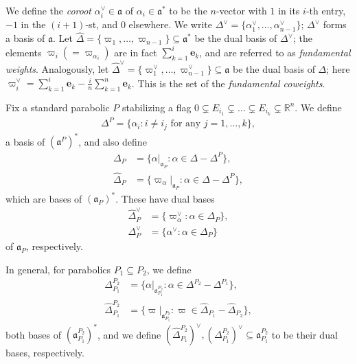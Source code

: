 \documentclass[11pt]{amsart}
\def\e{\textbf{e}}
\def\R{\mathbb{R}}
\numberwithin{theorem}{section}
\numberwithin{equation}{section}
\theoremstyle{remark}
\theoremstyle{definition}
\newcommand{\ga}{\mathfrak{a}}
\begin{document}
We define the \emph{coroot} $\alpha_i^\vee \in \ga$ of $\alpha_i \in \ga^*$ to be the $n$-vector with $1$ in its $i$-th entry, $-1$ in the $(i+1)$-st, and $0$ elsewhere. We write $\Delta^\vee = \{\alpha_1^\vee, \ldots, \alpha_{n-1}^\vee\}$; $\Delta^\vee$ forms a basis of $\ga$. Let $\widehat\Delta = \{\varpi_1,\ldots,\varpi_{n-1}\} \subseteq \ga^*$ be the dual basis of $\Delta^\vee$; the elements $\varpi_i (= \varpi_{\alpha_i})$ are in fact $\sum_{k=1}^i\e_k$, and are referred to as \emph{fundamental weights}. 
Analogously, let $\widehat\Delta^\vee = \{\varpi_1^\vee,\ldots,\varpi_{n-1}^\vee\} \subseteq \ga$ be the dual basis of $\Delta$; here $\varpi_i^\vee=\sum_{k=1}^i\e_k-\frac{i}{n}\sum_{k=1}^n\e_k$. This is the set of the \emph{fundamental coweights}.

Fix a standard parabolic $P$ stabilizing a flag $0 \subsetneq E_{i_1} \subsetneq \ldots \subsetneq E_{i_k} \subsetneq \R^n$. We define
\begin{align*}
\Delta^P = \{\alpha_i : i \neq i_j \mbox{ for any $j=1,\ldots,k$}\},
\end{align*}
a basis of $(\ga^P)^*$, and also define
\begin{align*}
\Delta_P &= \{\alpha \Big|_{\ga_{P}} : \alpha \in \Delta - \Delta^P\}, \\
\widehat\Delta_P &= \{\varpi_\alpha \Big|_{\ga_{P}} : \alpha \in \Delta - \Delta^P\},
\end{align*}
which are bases of $(\ga_{P})^*$. 
These have dual bases
\begin{align*}
\widehat\Delta_P^\vee &= \{\varpi_\alpha^\vee : \alpha \in \Delta_P\}, \\
\Delta_P^\vee &= \{\alpha^\vee : \alpha \in \Delta_P\}
\end{align*}
of $\ga_P$, respectively.

In general, for parabolics $P_1 \subseteq P_2$, we define
\begin{align*}
\Delta_{P_1}^{P_2} &= \{\alpha \Big|_{\ga_{P_1}^{P_2}} : \alpha \in \Delta^{P_2} - \Delta^{P_1}\}, \\
\widehat\Delta_{P_1}^{P_2} &= \{\varpi \Big|_{\ga_{P_1}^{P_2}} : \varpi \in \widehat\Delta_{P_1} - \widehat\Delta_{P_2}\},
\end{align*}
both bases of $(\ga_{P_1}^{P_2})^*$, and we define $(\widehat\Delta_{P_1}^{P_2})^\vee, (\Delta_{P_1}^{P_2})^\vee \subseteq \ga_{P_1}^{P_2}$ to be their dual bases, respectively.
\end{document}
